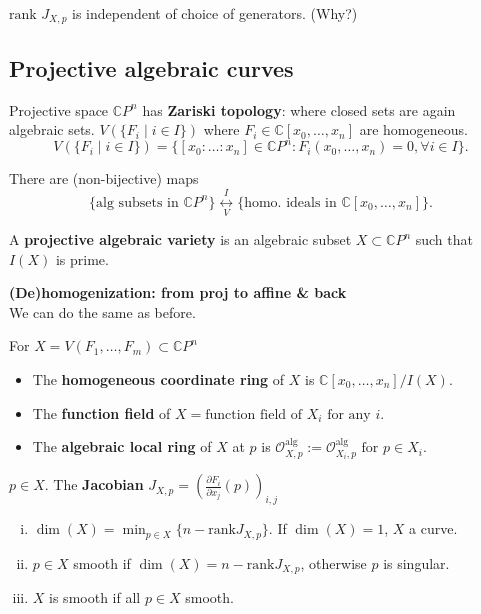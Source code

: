 \documentclass{article}
\begin{document}
\begin{remark}
$\text{rank } J_{X, p}$ is independent of choice of generators. (Why?)
\end{remark}

\subsection{Projective algebraic curves}

Projective space $\mathbb{C} P^n$ has \textbf{Zariski topology}: where closed sets are again algebraic sets. $V(\{ F_i \mid i \in I \})$ where $F_i \in \mathbb{C}[x_0, \ldots, x_n]$ are homogeneous.
$$
V(\{ F_i \mid i \in I \}) = \{ [x_0: \ldots: x_n] \in \mathbb{C} P^n : F_i(x_0, \ldots, x_n) = 0, \forall i \in I \}.
$$

There are (non-bijective) maps
$$
\{ \text{alg subsets in } \mathbb{C} P^n \} \underset{V}{\overset{I}{\longleftrightarrow}} \{ \text{homo. ideals in } \mathbb{C}[x_0, \ldots, x_n] \}.
$$

\begin{definition}
A \textbf{projective algebraic variety} is an algebraic subset $X \subset \mathbb{C} P^n$ such that $I(X)$ is prime.
\end{definition}

\textbf{(De)homogenization: from proj to affine \& back}\\
We can do the same as before.

\begin{definition}
For $X = V(F_1, \ldots, F_m) \subset \mathbb{C} P^n$
\begin{itemize}
    \item The \textbf{homogeneous coordinate ring} of $X$ is $\mathbb{C}[x_0, \ldots, x_n] / I(X)$.
    \item The \textbf{function field} of $X = \text{function field of } X_i \text{ for any } i$.
    \item The \textbf{algebraic local ring} of $X$ at $p$ is $\mathcal{O}_{X, p}^{\text{alg}} := \mathcal{O}_{X_i, p}^{\text{alg}} \text{ for } p \in X_i$.
\end{itemize}
\end{definition}

\begin{definition}
$p \in X$. The \textbf{Jacobian} $J_{X, p} = \left( \frac{\partial F_i}{\partial x_j} (p) \right)_{i, j}$
\end{definition}

\begin{enumerate}[(i)]
    \item $\dim(X) = \min_{p \in X} \{ n - \text{rank} J_{X, p} \}$. If $\dim(X) = 1$, $X$ a curve.
    \item $p \in X$ smooth if $\dim(X) = n - \text{rank} J_{X, p}$, otherwise $p$ is singular.
    \item $X$ is smooth if all $p \in X$ smooth.
\end{enumerate}
\end{document}
